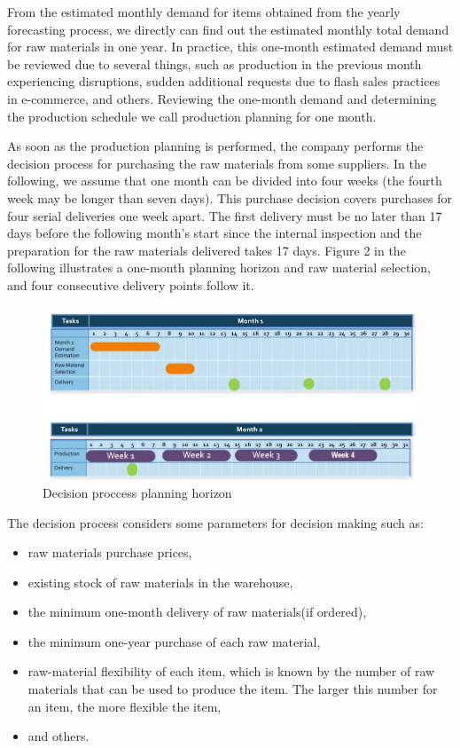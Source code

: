 \documentclass[preprint, 3p,
authoryear]{elsarticle} %
\providecommand{\tightlist}{%
  \setlength{\itemsep}{0pt}\setlength{\parskip}{0pt}}
\begin{document}
From the estimated monthly demand for items obtained from the yearly
forecasting process, we directly can find out the estimated monthly
total demand for raw materials in one year. In practice, this one-month
estimated demand must be reviewed due to several things, such as
production in the previous month experiencing disruptions, sudden
additional requests due to flash sales practices in e-commerce, and
others. Reviewing the one-month demand and determining the production
schedule we call production planning for one month.

As soon as the production planning is performed, the company performs
the decision process for purchasing the raw materials from some
suppliers. In the following, we assume that one month can be divided
into four weeks (the fourth week may be longer than seven days). This
purchase decision covers purchases for four serial deliveries one week
apart. The first delivery must be no later than 17 days before the
following month's start since the internal inspection and the
preparation for the raw materials delivered takes 17 days. Figure 2 in
the following illustrates a one-month planning horizon and raw material
selection, and four consecutive delivery points follow it.

\begin{figure}

{\centering \includegraphics[width=0.8\linewidth]{Supply Cycle 2} 

}

\caption{Decision proccess planning horizon}\label{fig:unnamed-chunk-3}
\end{figure}

The decision process considers some parameters for decision making such
as:

\begin{itemize}
\tightlist
\item
  raw materials purchase prices,
\item
  existing stock of raw materials in the warehouse,
\item
  the minimum one-month delivery of raw materials(if ordered),
\item
  the minimum one-year purchase of each raw material,
\item
  raw-material flexibility of each item, which is known by the number of
  raw materials that can be used to produce the item. The larger this
  number for an item, the more flexible the item,
\item
  and others.
\end{itemize}
\end{document}

